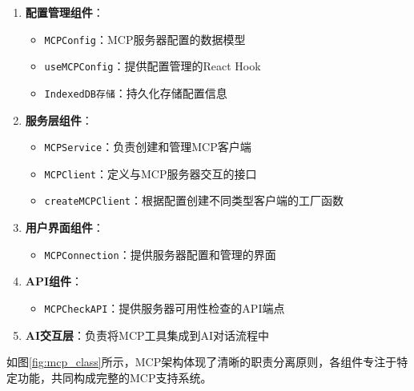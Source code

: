 \begin{enumerate}
  \item \textbf{配置管理组件}：
    \begin{itemize}
      \item \texttt{MCPConfig}：MCP服务器配置的数据模型
      \item \texttt{useMCPConfig}：提供配置管理的React Hook
      \item \texttt{IndexedDB存储}：持久化存储配置信息
    \end{itemize}
  
  \item \textbf{服务层组件}：
    \begin{itemize}
      \item \texttt{MCPService}：负责创建和管理MCP客户端
      \item \texttt{MCPClient}：定义与MCP服务器交互的接口
      \item \texttt{createMCPClient}：根据配置创建不同类型客户端的工厂函数
    \end{itemize}
  
  \item \textbf{用户界面组件}：
    \begin{itemize}
      \item \texttt{MCPConnection}：提供服务器配置和管理的界面
    \end{itemize}
  
  \item \textbf{API组件}：
    \begin{itemize}
      \item \texttt{MCPCheckAPI}：提供服务器可用性检查的API端点
    \end{itemize}
  
  \item \textbf{AI交互层}：负责将MCP工具集成到AI对话流程中
\end{enumerate}

如图\ref{fig:mcp_class}所示，MCP架构体现了清晰的职责分离原则，各组件专注于特定功能，共同构成完整的MCP支持系统。

